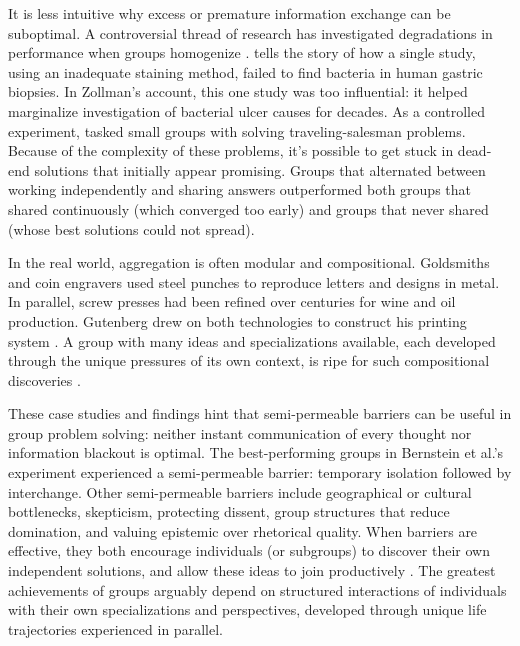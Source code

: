 \documentclass[11pt]{article}
\begin{document}
It is less intuitive why excess or premature information exchange can be suboptimal. A controversial thread of research has investigated degradations in performance when groups homogenize \citep{lazer2007network, frey2021social, janis1972victims}. \cite{zollman2010epistemic} tells the story of how a single study, using an inadequate staining method, failed to find bacteria in human gastric biopsies. In Zollman's account, this one study was too influential: it helped marginalize investigation of bacterial ulcer causes for decades. As a controlled experiment, \cite{bernstein2018intermittent} tasked small groups with solving traveling-salesman problems. Because of the complexity of these problems, it's possible to get stuck in dead-end solutions that initially appear promising. Groups that alternated between working independently and sharing answers outperformed both groups that shared continuously (which converged too early) and groups that never shared (whose best solutions could not spread).



In the real world, aggregation is often modular and compositional. Goldsmiths and coin engravers used steel punches to reproduce letters and designs in metal. In parallel, screw presses had been refined over centuries for wine and oil production. Gutenberg drew on both technologies to construct his printing system \citep{johnson2010where}. A group with many ideas and specializations available, each developed through the unique pressures of its own context, is ripe for such compositional discoveries \citep{derex2016partial}.

These case studies and findings hint that semi-permeable barriers can be useful in group problem solving: neither instant communication of every thought nor information blackout is optimal. The best-performing groups in Bernstein et al.'s experiment experienced a semi-permeable barrier: temporary isolation followed by interchange. Other semi-permeable barriers include geographical or cultural bottlenecks, skepticism, protecting dissent, group structures that reduce domination, and valuing epistemic over rhetorical quality. When barriers are effective, they both encourage individuals (or subgroups) to discover their own independent solutions, and allow these ideas to join productively \citep{surowiecki2005wisdom}. The greatest achievements of groups arguably depend on structured interactions of individuals with their own specializations and perspectives, developed through unique life trajectories experienced in parallel. 
\end{document}
